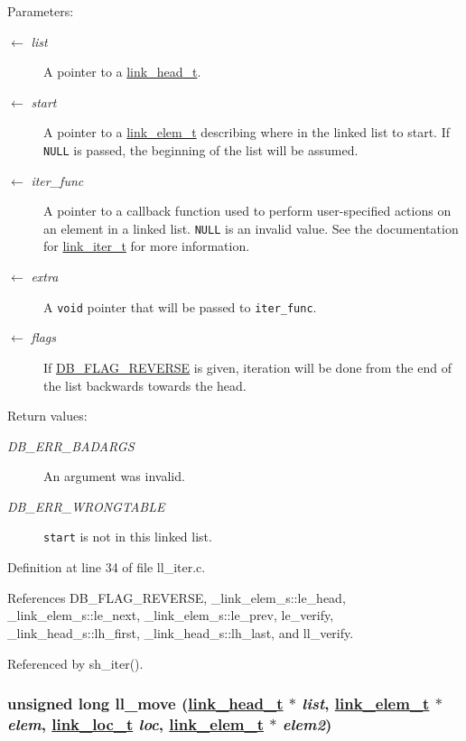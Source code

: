 \begin{Desc}
\item[Parameters:]
\begin{description}
\item[\mbox{$\leftarrow$} {\em list}]A pointer to a \hyperlink{group__dbprim__link_ga0}{link\_\-head\_\-t}. \item[\mbox{$\leftarrow$} {\em start}]A pointer to a \hyperlink{group__dbprim__link_ga1}{link\_\-elem\_\-t} describing where in the linked list to start. If {\tt NULL} is passed, the beginning of the list will be assumed. \item[\mbox{$\leftarrow$} {\em iter\_\-func}]A pointer to a callback function used to perform user-specified actions on an element in a linked list. {\tt NULL} is an invalid value. See the documentation for \hyperlink{group__dbprim__link_ga2}{link\_\-iter\_\-t} for more information. \item[\mbox{$\leftarrow$} {\em extra}]A {\tt void} pointer that will be passed to {\tt iter\_\-func}. \item[\mbox{$\leftarrow$} {\em flags}]If \hyperlink{group__dbprim_ga4}{DB\_\-FLAG\_\-REVERSE} is given, iteration will be done from the end of the list backwards towards the head.\end{description}
\end{Desc}
\begin{Desc}
\item[Return values:]
\begin{description}
\item[{\em DB\_\-ERR\_\-BADARGS}]An argument was invalid. \item[{\em DB\_\-ERR\_\-WRONGTABLE}]{\tt start} is not in this linked list.\end{description}
\end{Desc}


Definition at line 34 of file ll\_\-iter.c.

References DB\_\-FLAG\_\-REVERSE, \_\-link\_\-elem\_\-s::le\_\-head, \_\-link\_\-elem\_\-s::le\_\-next, \_\-link\_\-elem\_\-s::le\_\-prev, le\_\-verify, \_\-link\_\-head\_\-s::lh\_\-first, \_\-link\_\-head\_\-s::lh\_\-last, and ll\_\-verify.

Referenced by sh\_\-iter().\hypertarget{group__dbprim__link_ga7}{
\subsubsection[ll\_\-move]{\setlength{\rightskip}{0pt plus 5cm}unsigned long ll\_\-move (\hyperlink{struct__link__head__s}{link\_\-head\_\-t} $\ast$ {\em list}, \hyperlink{struct__link__elem__s}{link\_\-elem\_\-t} $\ast$ {\em elem}, \hyperlink{group__dbprim__link_ga4}{link\_\-loc\_\-t} {\em loc}, \hyperlink{struct__link__elem__s}{link\_\-elem\_\-t} $\ast$ {\em elem2})}}
\label{group__dbprim__link_ga7}


